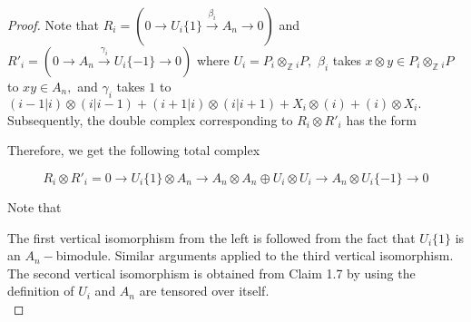\documentclass[psamsfonts,a4paper]{amsart}
\theoremstyle{plain}
\numberwithin{equation}{section}
\numberwithin{figure}{section}
\newcommand{\Z}{{\mathbb Z}}
\renewcommand{\b}{\beta}
\newcommand{\ra}{\rightarrow}
\newcommand{\xra}{\xrightarrow}
\newcommand{\ot}{\otimes}
\newcommand{\op}{\oplus}
\newcommand{\<}{\langle}
\renewcommand{\>}{\rangle}
\theoremstyle{named}
\theoremstyle{name}
\begin{document}
\color{blue}\begin{proof}
Note that $R_i = (0 \ra U_i\{1\} \xra{\b_i} A_n \ra 0)$ and \mbox{$R'_i = (0 \ra A_n \xra{\gamma_i} U_i\{-1\} \ra  0) $} where $U_i = P_i \ot_{\Z} {}_{i}P,$ $\b_i$ takes $ x \ot y \in P_i \ot_{\Z} {}_{i}P$ to $xy \in A_n,$ and $\gamma_i$ takes $1$ to $(i-1|i)\ot(i|i-1) + (i+1|i)\ot(i|i+1) + X_i\ot(i) + (i)\ot X_i.$
Subsequently, the double complex corresponding to $R_i  \ot R'_i$ has the form 


\begin{center}



\end{center}

Therefore, we get the following total complex

\[
R_i  \ot R'_i = 0 \ra U_i\{1\} \ot A_n \ra A_n \ot A_n \op U_i \ot U_i  \ra A_n \ot U_i\{-1\} \ra 0
\]

\noindent Note that 


The first vertical isomorphism from the left is followed from the fact that $U_i\{1\}$ is an $A_n-$bimodule. 
	Similar arguments applied to the third vertical isomorphism. 
	The second vertical isomorphism is obtained from Claim 1.7 by using the definition of $U_i$ and $A_n$ are tensored over itself.\\
	

\end{proof}
\end{document}
